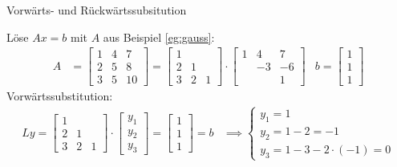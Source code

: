 \begin{algorithm}[H]
	\label{alg:subsitution}
	\caption{Vorwärts- und Rückwärtssubsitution}
\end{algorithm}
\begin{example}
Löse $Ax=b$ mit $A$ aus Beispiel \ref{eg:gauss}: 
\begin{align*}
	A &= \begin{bmatrix}
		1 & 4 & 7 \\
		2 & 5 & 8 \\
		3 & 5 & 10 
	\end{bmatrix} = \begin{bmatrix}
	1 \\
	2 & 1 \\
	3 & 2 & 1
	\end{bmatrix}
	\cdot
	\begin{bmatrix}
		1 & 4 & 7 \\
		  & -3 & -6 \\
		  & & 1
	\end{bmatrix}
	  & 
	b= \begin{bmatrix}
	1 \\ 1 \\ 1
	\end{bmatrix}
\end{align*}
Vorwärtssubstitution: 
\begin{align*}
Ly= \begin{bmatrix}
	1 \\
	2 & 1 \\
	3 & 2 & 1
\end{bmatrix}
\cdot 
\begin{bmatrix}
y_1 \\ y_{2} \\ y_3 
\end{bmatrix}
= 
\begin{bmatrix}
1 \\ 1 \\ 1
\end{bmatrix} =b 
&\implies \begin{cases}
	y_1=1 \\
	y_2= 1-2 =-1 \\
	y_3= 1-3-2\cdot (-1) =0
\end{cases}
\end{align*}

\end{example}
